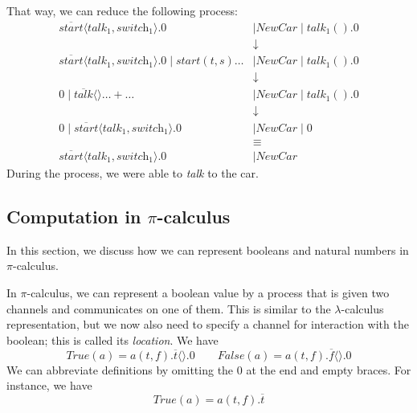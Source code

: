 \documentclass[a4paper, openany]{memoir}
\theoremstyle{definition}
\begin{document}
    That way, we can reduce the following process:
    \begin{align*}
        \overline{\textit{start}} \langle \textit{talk}_1, \textit{switch}_1 \rangle.0 &\mid \textit{NewCar} \mid \textit{talk}_1().0 \\
        &\downarrow \\
        \overline{\textit{start}} \langle \textit{talk}_1, \textit{switch}_1 \rangle.0 \mid \textit{start}(t, s)\dots &\mid \textit{NewCar} \mid \textit{talk}_1().0 \\
        &\downarrow \\
        0 \mid \overline{\textit{talk}} \langle \rangle \dots + \dots &\mid \textit{NewCar} \mid \textit{talk}_1().0 \\
        &\downarrow \\
        0 \mid \overline{\textit{start}} \langle \textit{talk}_1, \textit{switch}_1 \rangle.0 &\mid \textit{NewCar} \mid 0 \\
        &\equiv \\
        \overline{\textit{start}} \langle \textit{talk}_1, \textit{switch}_1 \rangle.0 &\mid \textit{NewCar}
    \end{align*}
    During the process, we were able to \textit{talk} to the car.

    \subsection{Computation in $\pi$-calculus}
    In this section, we discuss how we can represent booleans and natural numbers in $\pi$-calculus.

    In $\pi$-calculus, we can represent a boolean value by a process that is given two channels and communicates on one of them. This is similar to the $\lambda$-calculus representation, but we now also need to specify a channel for interaction with the boolean; this is called its \emph{location}. We have
    \[\textit{True}(a) = a(t, f).\overline{t}\langle\rangle.0 \qquad \textit{False}(a) = a(t, f).\overline{f}\langle\rangle.0\]
    We can abbreviate definitions by omitting the $0$ at the end and empty braces. For instance, we have
    \[\textit{True}(a) = a(t, f).\overline{t}\]
\end{document}
